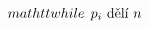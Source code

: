 \documentclass[preview]{standalone}
\begin{document}
\begin{align*}
\quad\\&\hspace*{-2em}mathtt{while} \:\: p_i \text{ dělí } n \:\:
\end{align*}
\end{document}
